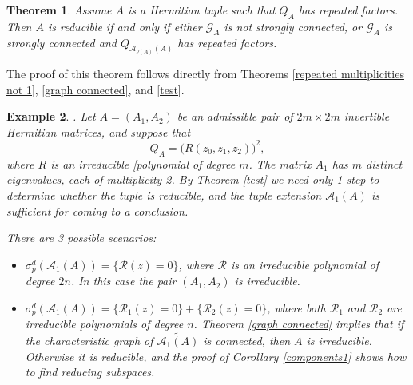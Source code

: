 \documentclass[draft, 12pt, reqno]{amsart}
\numberwithin{equation}{section}
\theoremstyle{plain}
\newtheorem{theorem}{Theorem}[section]
\newtheorem{example}[theorem]{Example}
\begin{document}
\begin{theorem}\label{kippen}
Assume $A$ is a Hermitian tuple such that $Q_A$ has repeated factors. Then $A$ is reducible if and only if either $\mathcal{G}_A$ is not strongly connected, or $\mathcal{G}_A$ is strongly connected and $Q_{\mathcal{A}_{\nu (A)}(A)}$ has repeated factors.
\end{theorem}
The proof of this theorem follows directly from Theorems \ref{repeated multiplicities not 1},  \ref{graph connected}, and \ref{test}.

 
\begin{example}. \normalfont Let $A=(A_1,A_2)$ be an admissible pair of $2m\times 2m$ invertible Hermitian matrices, and suppose that 
$$ Q_A= \big (R(z_0,z_1,z_2)\big)^2,$$
where $R$ is an irreducible [polynomial of degree $m$.  The matrix $A_1$ has $m$ distinct eigenvalues, each of multiplicity 2. 
By Theorem \ref{test} we need only 1 step to determine whether the tuple is reducible, and the tuple extension  $\mathcal{A}_1(A)$ is sufficient for coming to  a conclusion.

There are 3 possible scenarios:
\begin{itemize}
\item[1)] $\sigma_p^d(\mathcal{A}_1(A))=\big \{ \mathcal{R}(z)=0\big\}	$, where $\mathcal{R}$ is an irreducible polynomial of degree $2n$. In this case the pair $(A_1,A_2)$ is irreducible.
\item[2)] $\sigma_p^d(\mathcal{A}_1(A))= \big\{ \mathcal{R}_1(z)=0\big\}+\big\{ \mathcal{R}_2(z)=0\big\}$, where both $\mathcal{R}_1$ and $\mathcal{R}_2$ are irreducible polynomials of degree $n$. Theorem \ref{graph connected} implies that if the characteristic graph of $\widetilde{\mathcal{A}_1(A)}$ is connected, then $A$ is irreducible. Otherwise it is reducible, and the proof of Corollary \ref{components1} shows how to  find reducing subspaces.

\end{itemize}
\end{example}
\end{document}
